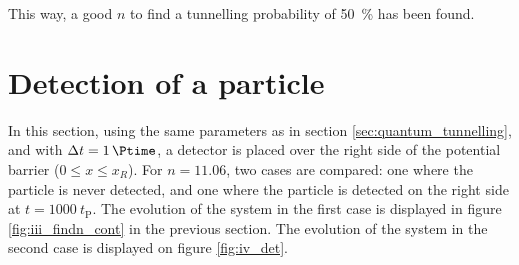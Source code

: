 \documentclass[a4paper,12pt,twoside]{article}
\begin{document}
      This way, a good $n$ to find a tunnelling probability of \SI{50}{\percent} has been found.


\newpage
\section{Detection of a particle}
\label{sec:det}

In this section, using the same parameters as in section \ref{sec:quantum_tunnelling}, and with $\Delta t = \SI{1}{\Ptime}$, a detector is placed over the right side of the potential barrier ($0\leq x \leq x_R$). For $n=11.06$, two cases are compared: one where the particle is never detected, and one where the particle is detected on the right side at $t=1000~t_\text{P}$. The evolution of the system in the first case is displayed in figure \ref{fig:iii_findn_cont} in the previous section. The evolution of the system in the second case is displayed on figure \ref{fig:iv_det}.
\end{document}
